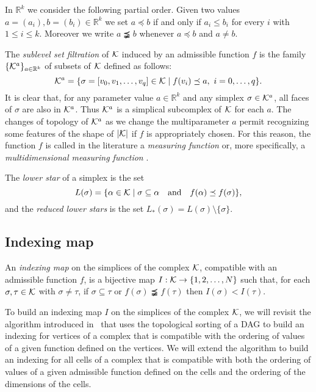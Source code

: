 \documentclass[12pt]{article}
\newcommand{\R}{{\mathbb R}}
\newcommand{\cK}{{\cal K}}
\begin{document}
\medskip

In $\R^k$ we consider the following partial order. Given two values $a=(a_i), b=(b_i)\in\R^k$ we set $a\preceq b$ if and only if
$a_i\le b_i$ for every $i$ with $1\le i\le k$. Moreover we write $a\precneqq b$ whenever $a\preceq b$ and $a\ne b$.


The {\em sublevel set filtration} of $\cK$ induced by an admissible function $f$ is the family $\{\cK^a\}_{a\in \R^k}$ of subsets of $\cK$ defined as follows:
\[
{\cK}^a=  \{\sigma=[v_0,v_1,\ldots,v_q]\in {\cK} \mid f(v_i)\preceq a, \ i=0,\ldots ,q\}.
\]
It is clear that, for any parameter value $a\in\R^k$ and any simplex $\sigma\in {\cK}^a$, all faces of $\sigma$ are also in ${\cK}^a$. Thus ${\cK}^a$ is a simplical subcomplex of $\cK$ for each $a$. The changes of topology of ${\cK}^a$ as we change the multiparameter $a$ permit recognizing some features of the shape of  $|{\cK}|$ if $f$ is appropriately chosen. For this reason, the function $f$ is called in the literature a {\em measuring function} or, more specifically, a {\em multidimensional measuring function} \cite{BiCe*08}.

\medskip

The {\em lower star} of a simplex is the set
\[
L(\sigma) = \{ \alpha \in \cK \mid  \sigma \subseteq \alpha
\quad \mbox{and} \quad f(\alpha) \preceq f(\sigma)\},
\]
and the {\em reduced lower stars} is the set
$L_*(\sigma)=L(\sigma)\setminus \{\sigma\}$.

\subsection{Indexing map}

An {\em indexing map} on the simplices of the complex $\cK$, compatible with an admissible function $f$, is a bijective map $I:{\cK} \to \{1,2,\ldots, N\}$ such that, for each
$\sigma, \tau \in {\cK}$ with $\sigma \ne \tau$, if $\sigma\subseteq \tau$ or $f(\sigma)\precneqq  f(\tau)$ then $I(\sigma)<I(\tau)$.

To build an indexing map $I$ on the simplices of the complex $\cK$, we will revisit the algorithm introduced in~\cite{AlKaLa17} that uses the topological sorting of a DAG
to build an indexing for vertices of a complex that is compatible with the ordering of values of a given function defined on the vertices.
We will extend the algorithm to build an indexing for all cells of a complex that is compatible with both the ordering of values of a given admissible
function defined on the cells and the ordering of the dimensions of the cells.
\end{document}
